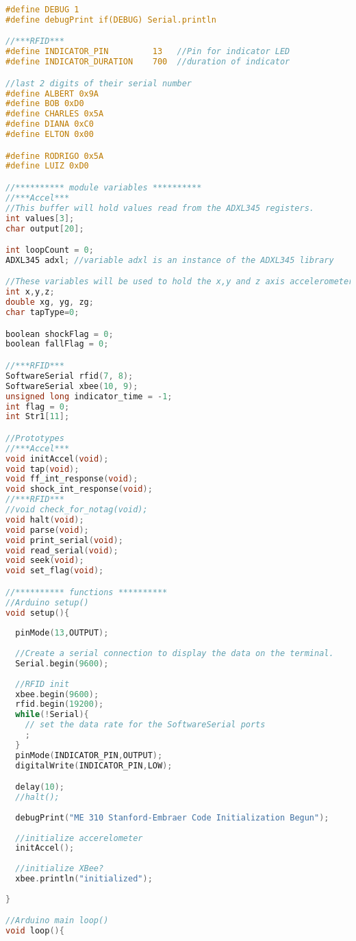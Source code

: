 \begin{lstlisting}[frame = single, language = C]
#define DEBUG 1
#define debugPrint if(DEBUG) Serial.println

//***RFID***
#define INDICATOR_PIN         13   //Pin for indicator LED
#define INDICATOR_DURATION    700  //duration of indicator

//last 2 digits of their serial number
#define ALBERT 0x9A
#define BOB 0xD0
#define CHARLES 0x5A
#define DIANA 0xC0
#define ELTON 0x00

#define RODRIGO 0x5A
#define LUIZ 0xD0

//********** module variables **********
//***Accel***
//This buffer will hold values read from the ADXL345 registers.
int values[3];
char output[20];

int loopCount = 0;
ADXL345 adxl; //variable adxl is an instance of the ADXL345 library

//These variables will be used to hold the x,y and z axis accelerometer values.
int x,y,z;
double xg, yg, zg;
char tapType=0;

boolean shockFlag = 0;
boolean fallFlag = 0;

//***RFID***
SoftwareSerial rfid(7, 8);
SoftwareSerial xbee(10, 9);
unsigned long indicator_time = -1;
int flag = 0;
int Str1[11];

//Prototypes
//***Accel***
void initAccel(void);
void tap(void);
void ff_int_response(void);
void shock_int_response(void);
//***RFID***
//void check_for_notag(void);
void halt(void);
void parse(void);
void print_serial(void);
void read_serial(void);
void seek(void);
void set_flag(void);

//********** functions **********
//Arduino setup()
void setup(){ 
  
  pinMode(13,OUTPUT);
  
  //Create a serial connection to display the data on the terminal.
  Serial.begin(9600);
  
  //RFID init
  xbee.begin(9600);
  rfid.begin(19200);
  while(!Serial){
    // set the data rate for the SoftwareSerial ports
    ;
  }
  pinMode(INDICATOR_PIN,OUTPUT);
  digitalWrite(INDICATOR_PIN,LOW);

  delay(10);
  //halt();
  
  debugPrint("ME 310 Stanford-Embraer Code Initialization Begun");
  
  //initialize accerelometer
  initAccel();
  
  //initialize XBee?
  xbee.println("initialized");
 
}

//Arduino main loop()
void loop(){  
  

\end{lstlisting}
